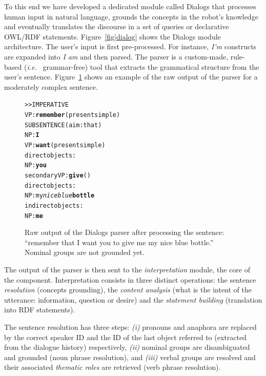 \documentclass{svmult}
\newcommand{\ie}{{\textit{i.e.~}}}
\begin{document}
To this end we have developed a dedicated module called {\sc Dialogs} that processes human
input in natural language, grounds the concepts in the robot's knowledge and
eventually translates the discourse in a set of queries or declarative OWL/RDF
statements. Figure~\ref{fig|dialog} shows the {\sc Dialogs} module architecture. The user's
input is first pre-processed. For instance, \emph{I'm} constructs are expanded
into \emph{I am} and then parsed. The parser is a custom-made, rule-based (\ie
grammar-free) tool that extracts the grammatical structure from the user's
sentence. Figure~\ref{dialog|parser_output} shows an example of the raw output of the parser for a moderately complex sentence.

\begin{figure}%
\begin{center}
\scriptsize
\begin{alltt}
>> IMPERATIVE
VP: \textbf{remember} (present simple)
    SUBSENTENCE (aim: that)
      NP: \textbf{I}
      VP: \textbf{want} (present simple)
        direct objects: 
          NP: \textbf{you}
        secondary VP: \textbf{give} ()
              direct objects:
                NP: my \emph{nice blue} \textbf{bottle}
              indirect objects:
                NP: \textbf{me}
\end{alltt}
\end{center}
\caption{Raw output of the {\sc Dialogs} parser after processing the
sentence: ``remember that I want you to give me my nice blue bottle.'' 
Nominal groups are not grounded yet.} 
\label{dialog|parser_output}
\end{figure}

The output of the parser is then sent to the \emph{interpretation} module, the
core of the component.  Interpretation consists in three distinct operations:
the sentence \emph{resolution} (concepts grounding), the \emph{content
analysis} (what is the intent of the utterance: information, question or
desire) and the \emph{statement building} (translation into RDF statements).

The sentence resolution has three steps: {\it(i)} pronouns and anaphora are
replaced by the correct speaker ID and the ID of the last object referred to
(extracted from the dialogue history) respectively, {\it(ii)} nominal groups are
disambiguated and grounded (noun phrase resolution), and {\it(iii)}
verbal groups are resolved and their associated \emph{thematic roles} are
retrieved (verb phrase resolution).
\end{document}
